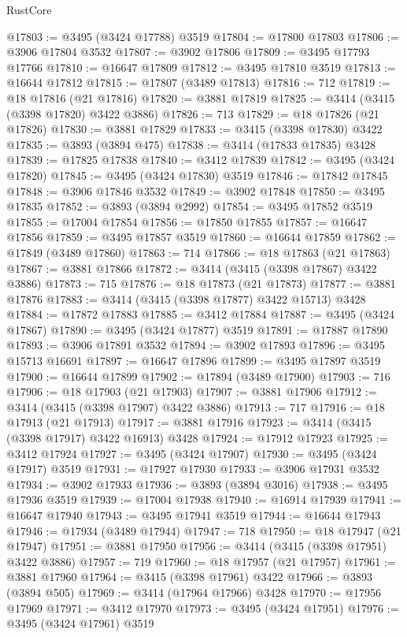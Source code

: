 \begin{lexlean}{RustCore}
\begin{coremodule}
@17803 := @3495 (@3424 @17788) @3519
@17804 := @17800 @17803
@17806 := @3906 @17804 @3532
@17807 := @3902 @17806
@17809 := @3495 @17793 @17766
@17810 := @16647 @17809
@17812 := @3495 @17810 @3519
@17813 := @16644 @17812
@17815 := @17807 (@3489 @17813)
@17816 := 712
@17819 := @18 @17816 (@21 @17816)
@17820 := @3881 @17819
@17825 := @3414 (@3415 (@3398 @17820) @3422 @3886)
@17826 := 713
@17829 := @18 @17826 (@21 @17826)
@17830 := @3881 @17829
@17833 := @3415 (@3398 @17830) @3422
@17835 := @3893 (@3894 @475)
@17838 := @3414 (@17833 @17835) @3428
@17839 := @17825 @17838
@17840 := @3412 @17839
@17842 := @3495 (@3424 @17820)
@17845 := @3495 (@3424 @17830) @3519
@17846 := @17842 @17845
@17848 := @3906 @17846 @3532
@17849 := @3902 @17848
@17850 := @3495 @17835
@17852 := @3893 (@3894 @2992)
@17854 := @3495 @17852 @3519
@17855 := @17004 @17854
@17856 := @17850 @17855
@17857 := @16647 @17856
@17859 := @3495 @17857 @3519
@17860 := @16644 @17859
@17862 := @17849 (@3489 @17860)
@17863 := 714
@17866 := @18 @17863 (@21 @17863)
@17867 := @3881 @17866
@17872 := @3414 (@3415 (@3398 @17867) @3422 @3886)
@17873 := 715
@17876 := @18 @17873 (@21 @17873)
@17877 := @3881 @17876
@17883 := @3414 (@3415 (@3398 @17877) @3422 @15713) @3428
@17884 := @17872 @17883
@17885 := @3412 @17884
@17887 := @3495 (@3424 @17867)
@17890 := @3495 (@3424 @17877) @3519
@17891 := @17887 @17890
@17893 := @3906 @17891 @3532
@17894 := @3902 @17893
@17896 := @3495 @15713 @16691
@17897 := @16647 @17896
@17899 := @3495 @17897 @3519
@17900 := @16644 @17899
@17902 := @17894 (@3489 @17900)
@17903 := 716
@17906 := @18 @17903 (@21 @17903)
@17907 := @3881 @17906
@17912 := @3414 (@3415 (@3398 @17907) @3422 @3886)
@17913 := 717
@17916 := @18 @17913 (@21 @17913)
@17917 := @3881 @17916
@17923 := @3414 (@3415 (@3398 @17917) @3422 @16913) @3428
@17924 := @17912 @17923
@17925 := @3412 @17924
@17927 := @3495 (@3424 @17907)
@17930 := @3495 (@3424 @17917) @3519
@17931 := @17927 @17930
@17933 := @3906 @17931 @3532
@17934 := @3902 @17933
@17936 := @3893 (@3894 @3016)
@17938 := @3495 @17936 @3519
@17939 := @17004 @17938
@17940 := @16914 @17939
@17941 := @16647 @17940
@17943 := @3495 @17941 @3519
@17944 := @16644 @17943
@17946 := @17934 (@3489 @17944)
@17947 := 718
@17950 := @18 @17947 (@21 @17947)
@17951 := @3881 @17950
@17956 := @3414 (@3415 (@3398 @17951) @3422 @3886)
@17957 := 719
@17960 := @18 @17957 (@21 @17957)
@17961 := @3881 @17960
@17964 := @3415 (@3398 @17961) @3422
@17966 := @3893 (@3894 @505)
@17969 := @3414 (@17964 @17966) @3428
@17970 := @17956 @17969
@17971 := @3412 @17970
@17973 := @3495 (@3424 @17951)
@17976 := @3495 (@3424 @17961) @3519

\end{coremodule}
\end{lexlean}
